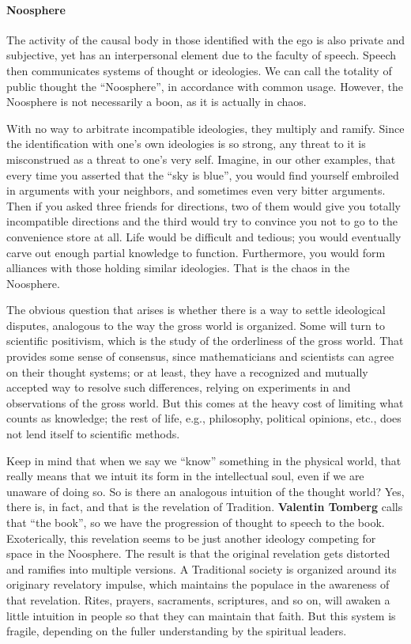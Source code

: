 \paragraph{Noosphere}


The activity of the causal body in those identified with the ego is also private and subjective, yet has an interpersonal element due to the faculty of speech. Speech then communicates systems of thought or ideologies. We can call the totality of public thought the ``Noosphere'', in accordance with common usage. However, the Noosphere is not necessarily a boon, as it is actually in chaos.

With no way to arbitrate incompatible ideologies, they multiply and ramify. Since the identification with one's own ideologies is so strong, any threat to it is misconstrued as a threat to one's very self. Imagine, in our other examples, that every time you asserted that the ``sky is blue'', you would find yourself embroiled in arguments with your neighbors, and sometimes even very bitter arguments. Then if you asked three friends for directions, two of them would give you totally incompatible directions and the third would try to convince you not to go to the convenience store at all. Life would be difficult and tedious; you would eventually carve out enough partial knowledge to function. Furthermore, you would form alliances with those holding similar ideologies. That is the chaos in the Noosphere.

The obvious question that arises is whether there is a way to settle ideological disputes, analogous to the way the gross world is organized. Some will turn to scientific positivism, which is the study of the orderliness of the gross world. That provides some sense of consensus, since mathematicians and scientists can agree on their thought systems; or at least, they have a recognized and mutually accepted way to resolve such differences, relying on experiments in and observations of the gross world. But this comes at the heavy cost of limiting what counts as knowledge; the rest of life, e.g., philosophy, political opinions, etc., does not lend itself to scientific methods.

Keep in mind that when we say we ``know'' something in the physical world, that really means that we intuit its form in the intellectual soul, even if we are unaware of doing so. So is there an analogous intuition of the thought world? Yes, there is, in fact, and that is the revelation of Tradition. \textbf{Valentin Tomberg} calls that ``the book'', so we have the progression of thought to speech to the book. Exoterically, this revelation seems to be just another ideology competing for space in the Noosphere. The result is that the original revelation gets distorted and ramifies into multiple versions. A Traditional society is organized around its originary revelatory impulse, which maintains the populace in the awareness of that revelation. Rites, prayers, sacraments, scriptures, and so on, will awaken a little intuition in people so that they can maintain that faith. But this system is fragile, depending on the fuller understanding by the spiritual leaders.

